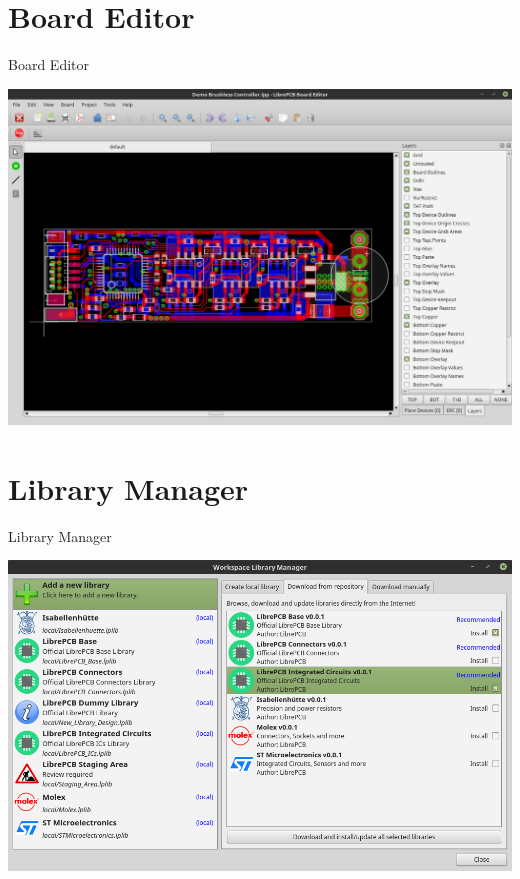 \documentclass[aspectratio=1610,t]{beamer}
\begin{document}

\section{Board Editor}

\begin{frame}{Board Editor}
	\begin{center}
		\includegraphics[width=0.7\paperwidth]{images/board_editor.png}
	\end{center}
\end{frame}


\section{Library Manager}

\begin{frame}{Library Manager}
	\begin{center}
		\includegraphics[width=0.7\paperwidth]{images/library_manager.png}
	\end{center}
\end{frame}
\end{document}
